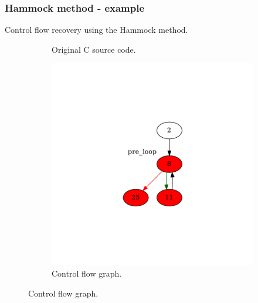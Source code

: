\documentclass[aspectratio=1610]{beamer}
\begin{document}
\begin{frame}
	\frametitle{Hammock method - example}
	Control flow recovery using the Hammock method.
	\begin{figure}[htbp]
		\centering
		\begin{subfigure}[b]{0.30\textwidth}
			\centering
			
			\caption{Original C source code.}
		\end{subfigure}
		\begin{subfigure}[b]{0.50\textwidth}
			\centering
			\includegraphics[height=0.6\paperheight]{inc/methods/hammock/example/without-break/main_0003a.png}
			\caption{Control flow graph.}
		\end{subfigure}
	\end{figure}
\end{frame}
\end{document}
